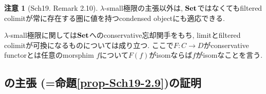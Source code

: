 \documentclass[dvipdfmx,a4paper,11pt]{article}
\theoremstyle{definition}
\newtheorem{rem}[thm]{注意}
\begin{document}
 
 \begin{rem}[Sch19. Remark 2.10]
 $\lambda$-small極限の主張以外は, ${\bf Set}$ではなくてもfiltered colimitが常に存在する圏に値を持つcondensed objectにも適応できる.
 
  $\lambda$-small極限に関しては${\bf Set}$へのconservative忘却関手をもち, limitとfiltered colimitが可換になるものについては成り立つ. 
   ここで$F : C \to D$がconservative functorとは任意のmorsphim $f$について$F(f)$がisomならば$f$がisomなことを言う. 
 \end{rem}


\subsection{\cite[Proposition 2.9]{Sch19}の主張 (=命題\ref{prop-Sch19-2.9})の証明}
\end{document}
